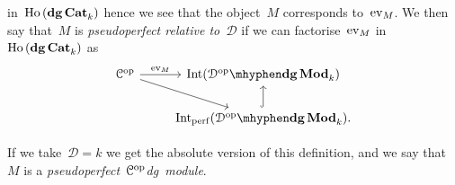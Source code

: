 \begin{refsection}
\begin{definition}
  in~$\operatorname{\mathrm{Ho} \,}(\mathbf{dg\,Cat}_k)$ hence we see that the object~$M$ corresponds to~$\operatorname{ev}_M$. We then say that~$M$ is \emph{pseudoperfect relative to~$\mathcal{D}$} if we can factorise~$\operatorname{ev}_M$ in~$\operatorname{\mathrm{Ho} \,}(\mathbf{dg\,Cat}_k)$ as
  \begin{equation}
    \begin{tikzcd}
      \mathcal{C}^\opp \arrow{r}{\ev_M} \arrow{rd} & \Int(\dgMod{\mathcal{D}^\opp}_k) \\
      & \Int_\perf(\dgMod{\mathcal{D}^\opp}_k) \arrow[hook]{u}.
    \end{tikzcd}
  \end{equation}
\end{definition}
If we take~$\mathcal{D}=k$ we get the absolute version of this definition, and we say that $M$ is a \emph{pseudoperfect~$\mathcal{C}^{\mathrm{op}}$\dash dg~module}.


\end{refsection}

